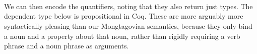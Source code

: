 \begin{code}[hide]%
\>[0]\<%
\\
\>[0][@{}l@{\AgdaIndent{0}}]%
\>[2]\AgdaSpace{}%
\AgdaSymbol{:}\AgdaSpace{}%
\<%
\end{code}
\begin{code}%
\>[0]\<%
\\
\>[0][@{}l@{\AgdaIndent{0}}]%
\>[2]\AgdaSpace{}%
\AgdaSymbol{:}\AgdaSpace{}%
\AgdaSpace{}%
\AgdaSymbol{->}\AgdaSpace{}%
\<%
\end{code}
\begin{code}[hide]%
\>[0]\<%
\\
\>[0][@{}l@{\AgdaIndent{0}}]%
\>[2]\AgdaSpace{}%
\AgdaSpace{}%
\AgdaSpace{}%
\AgdaSpace{}%
\AgdaSpace{}%
\AgdaSymbol{:}\AgdaSpace{}%
\<%
\end{code}

We can then encode the quantifiers, noting that they also return just types. The
dependent type  below is propositional in Coq. These are more arguably
more syntactically pleasing than our Mongtagovian semantics, because they only
bind a noun and a property about that noun, rather than rigidly requiring a verb
phrase and a noun phrase as arguments.

\begin{code}%
\>[0]\AgdaSpace{}%
\AgdaSymbol{:}\AgdaSpace{}%
\AgdaSymbol{(}\AgdaSpace{}%
\AgdaSymbol{:}\AgdaSpace{}%
\AgdaSymbol{)}\AgdaSpace{}%
\AgdaSpace{}%
\AgdaSymbol{(}\AgdaSpace{}%
\AgdaSymbol{:}\AgdaSpace{}%
\AgdaSpace{}%
\AgdaSpace{}%
\AgdaSymbol{)}\AgdaSpace{}%
\AgdaSpace{}%
\<%
\\
\>[0]\AgdaSpace{}%
\AgdaSpace{}%
\AgdaSpace{}%
\AgdaSymbol{=}\AgdaSpace{}%
\AgdaFunction{Σ[}\AgdaSpace{}%
\AgdaSpace{}%
\AgdaSpace{}%
\AgdaSpace{}%
\AgdaFunction{]}\AgdaSpace{}%
\AgdaSpace{}%
\<%
\\
%
\\[\AgdaEmptyExtraSkip]%
\>[0]\AgdaSpace{}%
\AgdaSymbol{:}\AgdaSpace{}%
\AgdaSymbol{(}\AgdaSpace{}%
\AgdaSymbol{:}\AgdaSpace{}%
\AgdaSymbol{)}\AgdaSpace{}%
\AgdaSpace{}%
\AgdaSymbol{(}\AgdaSpace{}%
\AgdaSymbol{:}\AgdaSpace{}%
\AgdaSpace{}%
\AgdaSpace{}%
\AgdaSymbol{)}\AgdaSpace{}%
\AgdaSpace{}%
\<%
\\
\>[0]\AgdaSpace{}%
\AgdaSpace{}%
\AgdaSpace{}%
\AgdaSymbol{=}\AgdaSpace{}%
\AgdaSymbol{(}\AgdaSpace{}%
\AgdaSymbol{:}\AgdaSpace{}%
\AgdaSymbol{)}\AgdaSpace{}%
\AgdaSpace{}%
\AgdaSpace{}%
\<%
\end{code}

